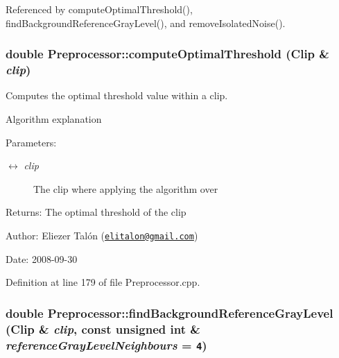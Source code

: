 Referenced by computeOptimalThreshold(), findBackgroundReferenceGrayLevel(), and removeIsolatedNoise().\hypertarget{class_preprocessor_84fcd2ccbbecea37f4bcdae5d7547ecd}{
\subsubsection[computeOptimalThreshold]{\setlength{\rightskip}{0pt plus 5cm}double Preprocessor::computeOptimalThreshold ({\bf Clip} \& {\em clip})}}
\label{class_preprocessor_84fcd2ccbbecea37f4bcdae5d7547ecd}


Computes the optimal threshold value within a clip. 

Algorithm explanation

\begin{Desc}
\item[Parameters:]
\begin{description}
\item[\mbox{$\leftrightarrow$} {\em clip}]The clip where applying the algorithm over\end{description}
\end{Desc}
\begin{Desc}
\item[Returns:]The optimal threshold of the clip\end{Desc}
\begin{Desc}
\item[Author:]Eliezer Talón (\href{mailto:elitalon@gmail.com}{\tt elitalon@gmail.com}) \end{Desc}
\begin{Desc}
\item[Date:]2008-09-30 \end{Desc}


Definition at line 179 of file Preprocessor.cpp.\hypertarget{class_preprocessor_02439b5f88c76ddd6e3c92f3b22d56e0}{
\subsubsection[findBackgroundReferenceGrayLevel]{\setlength{\rightskip}{0pt plus 5cm}double Preprocessor::findBackgroundReferenceGrayLevel ({\bf Clip} \& {\em clip}, \/  const unsigned int \& {\em referenceGrayLevelNeighbours} = {\tt 4})}}
\label{class_preprocessor_02439b5f88c76ddd6e3c92f3b22d56e0}


